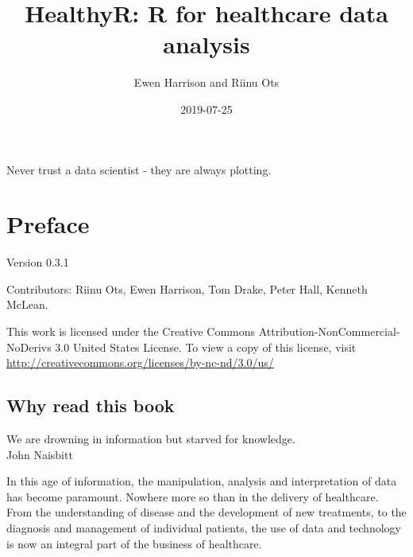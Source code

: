 \documentclass[12pt,]{krantz}
\title{HealthyR: R for healthcare data analysis}
\author{Ewen Harrison and Riinu Ots}
\date{2019-07-25}
\renewenvironment{quote}{\begin{VF}}{\end{VF}}
\theoremstyle{definition}
\theoremstyle{definition}
\theoremstyle{definition}
\theoremstyle{remark}
\begin{document}
\maketitle


\thispagestyle{empty}

\begin{center}
Never trust a data scientist - they are always plotting.
\end{center}

\setlength{\abovedisplayskip}{-5pt}
\setlength{\abovedisplayshortskip}{-5pt}

{
\hypersetup{linkcolor=}
\setcounter{tocdepth}{2}
\tableofcontents
}
\listoftables
\listoffigures
\hypertarget{preface}{%
\chapter*{Preface}\label{preface}}


Version 0.3.1

Contributors: Riinu Ots, Ewen Harrison, Tom Drake, Peter Hall, Kenneth
McLean.

This work is licensed under the Creative Commons
Attribution-NonCommercial-NoDerivs 3.0 United States License. To view a
copy of this license, visit
\url{http://creativecommons.org/licenses/by-nc-nd/3.0/us/}

\hypertarget{why-read-this-book}{%
\section*{Why read this book}\label{why-read-this-book}}


\begin{quote}
We are drowning in information but starved for knowledge.\\
John Naisbitt
\end{quote}

In this age of information, the manipulation, analysis and
interpretation of data has become paramount. Nowhere more so than in the
delivery of healthcare. From the understanding of disease and the
development of new treatments, to the diagnosis and management of
individual patients, the use of data and technology is now an integral
part of the business of healthcare.
\end{document}
